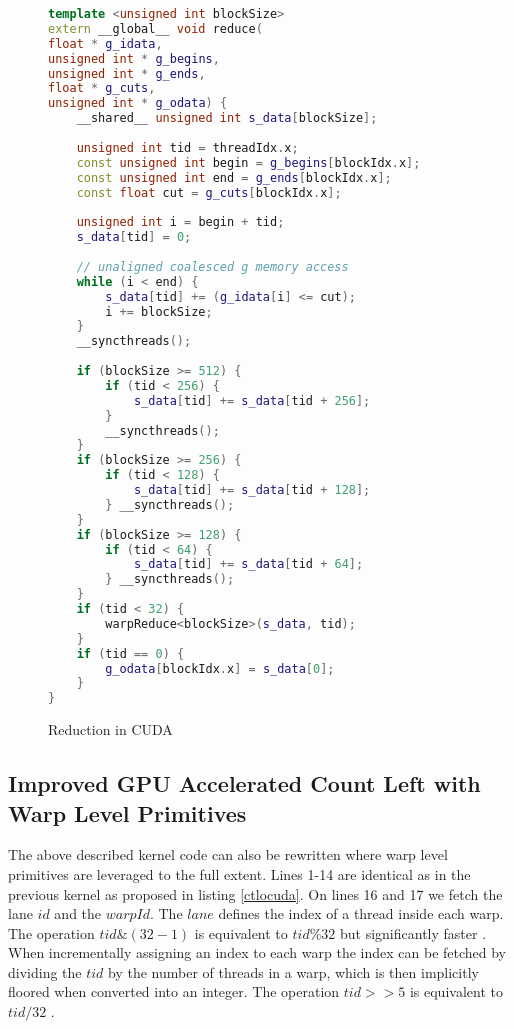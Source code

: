 \documentclass[]{article}
\begin{document}
\begin{figure}[H]
	\begin{lstlisting}[language=c++, caption=Kernel Optimized GPU Count Left, label = ctlocuda]
template <unsigned int blockSize>
extern __global__ void reduce(
float * g_idata,
unsigned int * g_begins,
unsigned int * g_ends,
float * g_cuts,
unsigned int * g_odata) {
	__shared__ unsigned int s_data[blockSize];
	
	unsigned int tid = threadIdx.x;
	const unsigned int begin = g_begins[blockIdx.x];
	const unsigned int end = g_ends[blockIdx.x];
	const float cut = g_cuts[blockIdx.x];
	
	unsigned int i = begin + tid;
	s_data[tid] = 0;
	
	// unaligned coalesced g memory access
	while (i < end) {
		s_data[tid] += (g_idata[i] <= cut);
		i += blockSize;
	}
	__syncthreads();
	
	if (blockSize >= 512) {
		if (tid < 256) {
			s_data[tid] += s_data[tid + 256];
		}
		__syncthreads();
	}
	if (blockSize >= 256) {
		if (tid < 128) {
			s_data[tid] += s_data[tid + 128];
		} __syncthreads();
	}
	if (blockSize >= 128) {
		if (tid < 64) {
			s_data[tid] += s_data[tid + 64];
		} __syncthreads();
	}
	if (tid < 32) {
		warpReduce<blockSize>(s_data, tid);
	}
	if (tid == 0) {
		g_odata[blockIdx.x] = s_data[0];
	}
}
	\end{lstlisting}
	\caption{Reduction in CUDA}
	\label{cuda:reduction2}
\end{figure}


\subsection{Improved GPU Accelerated Count Left with Warp Level Primitives} \label{imprctlwrp}

The above described kernel code can also be rewritten where warp level primitives are leveraged to the full extent. Lines 1-14 are identical as in the previous kernel as proposed in listing \ref{ctlocuda}.
On lines 16 and 17 we fetch the lane $id$ and the $warpId$. The $lane$ defines the index of a thread inside each warp. The operation $tid \& (32 - 1)$ is equivalent to $tid \% 32$ but significantly faster \cite{bestp}.
When incrementally assigning an index to each warp the index can be fetched by dividing the $tid$ by the number of threads in a warp, which is then implicitly floored when converted into an integer. The operation $tid >> 5$ is equivalent to $tid / 32$ \cite{bestp}.
\end{document}
